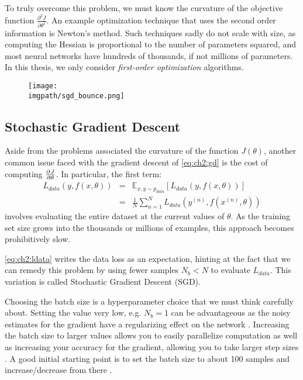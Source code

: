   To truly overcome this problem, we must know the curvature
  of the objective function $\frac{\partial^2 J}{\partial \theta^2}$. An example
  optimization technique that uses the second order information is Newton's
  method. Such techniques sadly do not scale with size, as computing the Hessian
  is proportional to the number of parameters squared, and most neural networks
  have hundreds of thousands, if not millions of parameters. In this thesis, we
  only consider \emph{first-order optimization} algorithms.

  \begin{figure}[t]
  \centering
  \texttt{[image: \\imgpath/sgd\_bounce.png]}
  \label{fig:ch2:gd_bounce}
\end{figure}

\subsection{Stochastic Gradient Descent}
Aside from the problems associated the curvature of the function $J(\theta)$,
another common issue faced with the gradient descent of \eqref{eq:ch2:gd} is the
cost of computing $\frac{\partial J}{\partial \theta}$. In particular, the first term:
\begin{eqnarray}\label{eq:ch2:ldata}
  L_{data}(y, f(x, \theta)) &=& \mathbb{E}_{x,y \sim p_{data}}\left[ L_{data}(y, f(x, \theta))\right] \\
&=& \frac{1}{N}\sum_{n=1}^N L_{data}\left(y^{(n)}, f(x^{(n)}, \theta)\right) 
\end{eqnarray}
involves evaluating the entire dataset at the current values of $\theta$. As the
training set size grows into the thousands or millions of examples, this
approach becomes prohibitively slow. 

\eqref{eq:ch2:ldata} writes the data loss as an expectation, hinting at the fact that 
we can remedy this problem by using fewer samples $N_b < N$ to evaluate $L_{data}$. 
This variation is called Stochastic Gradient Descent (SGD).

Choosing the batch size is a hyperparameter choice that we must think carefully
about. Setting the value very low, e.g. $N_b = 1$ can be advantageous as the
noisy estimates for the gradient have a regularizing effect on the network
\cite{wilson_general_2003}. Increasing the batch size to larger values allows
you to easily parallelize computation as well as increasing your accuracy for
the gradient, allowing you to take larger step sizes \cite{smith_dont_2017}.
A good initial starting point is to set the batch size to about 100 samples and
increase/decrease from there \cite{goodfellow_deep_2016}.

